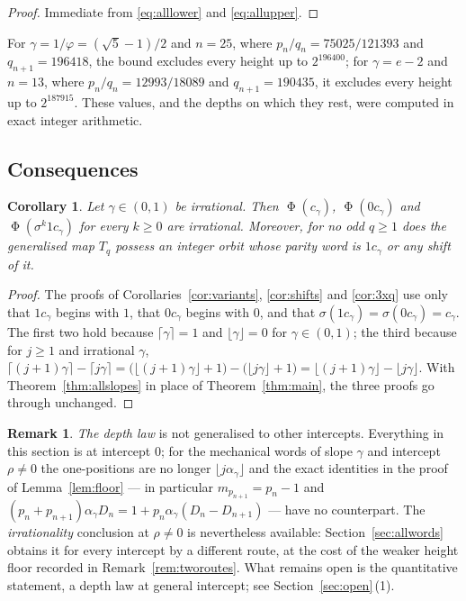 \documentclass[11pt,reqno]{amsart}
\theoremstyle{plain}
\newtheorem{corollary}[theorem]{Corollary}
\theoremstyle{definition}
\newtheorem{remark}[theorem]{Remark}
\DeclareMathOperator{\Ph}{\Phi}
\begin{document}
\begin{proof}
Immediate from \eqref{eq:alllower} and \eqref{eq:allupper}.
\end{proof}

\noindent For $\gamma=1/\varphi=(\sqrt5-1)/2$ and $n=25$, where
$p_n/q_n=75025/121393$ and $q_{n+1}=196418$, the bound excludes every height up
to $2^{196400}$; for $\gamma=e-2$ and $n=13$, where $p_n/q_n=12993/18089$ and
$q_{n+1}=190435$, it excludes every height up to $2^{187915}$. These values,
and the depths on which they rest, were computed in exact integer arithmetic.

\subsection*{Consequences}

\begin{corollary}\label{cor:allvariants}
Let $\gamma\in(0,1)$ be irrational. Then $\Ph(c_\gamma)$, $\Ph(0c_\gamma)$ and
$\Ph(\sigma^{k}1c_\gamma)$ for every $k\ge0$ are irrational. Moreover, for no
odd $q\ge1$ does the generalised map $T_q$ possess an integer orbit whose parity
word is $1c_\gamma$ or any shift of it.
\end{corollary}

\begin{proof}
The proofs of Corollaries~\ref{cor:variants}, \ref{cor:shifts} and
\ref{cor:3xq} use only that $1c_\gamma$ begins with $1$, that $0c_\gamma$ begins
with $0$, and that $\sigma(1c_\gamma)=\sigma(0c_\gamma)=c_\gamma$. The first two
hold because $\lceil\gamma\rceil=1$ and $\lfloor\gamma\rfloor=0$ for
$\gamma\in(0,1)$; the third because for $j\ge1$ and irrational $\gamma$,
$\lceil(j+1)\gamma\rceil-\lceil j\gamma\rceil
=\bigl(\lfloor(j+1)\gamma\rfloor+1\bigr)-\bigl(\lfloor j\gamma\rfloor+1\bigr)
=\lfloor(j+1)\gamma\rfloor-\lfloor j\gamma\rfloor$. With
Theorem~\ref{thm:allslopes} in place of Theorem~\ref{thm:main}, the three proofs
go through unchanged.
\end{proof}

\begin{remark}\label{rem:intercept}
\emph{The depth law} is not generalised to other intercepts. Everything in this
section is at intercept $0$; for the mechanical words of slope $\gamma$ and
intercept $\rho\ne0$ the one-positions are no longer
$\lfloor j\alpha_\gamma\rfloor$ and the exact identities in the proof of
Lemma~\ref{lem:floor} --- in particular $m_{p_{n+1}}=p_n-1$ and
$(p_n+p_{n+1})\alpha_\gamma D_n=1+p_n\alpha_\gamma(D_n-D_{n+1})$ --- have no
counterpart. The \emph{irrationality} conclusion at $\rho\ne0$ is nevertheless
available: Section~\ref{sec:allwords} obtains it for every intercept by a
different route, at the cost of the weaker height floor recorded in
Remark~\ref{rem:tworoutes}. What remains open is the quantitative statement, a
depth law at general intercept; see Section~\ref{sec:open}\,(1).
\end{remark}
\end{document}
